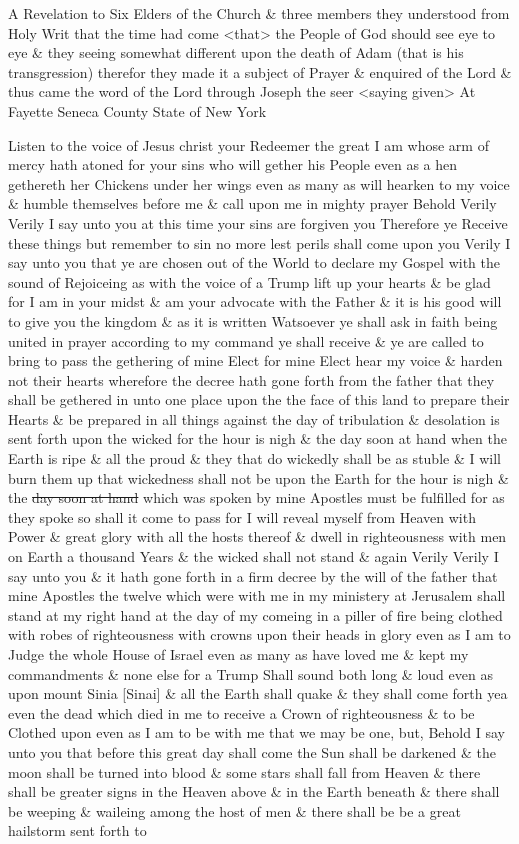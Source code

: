 				A Revelation to Six Elders of the Church \& three members they understood from Holy Writ that the time had come <that> the People of God should see eye to eye \& they seeing somewhat different upon the death of Adam (that is his transgression) therefor they made it a subject of Prayer \& enquired of the Lord \& thus came the word of the Lord through Joseph the seer <saying given> At Fayette Seneca County State of New York
				
				Listen to the voice of Jesus christ your Redeemer the great I am whose arm of mercy hath atoned for your sins who will gether his People even as a hen gethereth her Chickens under her wings even as many as will hearken to my voice \& humble themselves before me \& call upon me in mighty prayer Behold Verily Verily I say unto you at this time your sins are forgiven you Therefore ye Receive these things but remember to sin no more lest perils shall come upon you Verily I say unto you that ye are chosen out of the World to declare my Gospel with the sound of Rejoiceing as with the voice of a Trump lift up your hearts \& be glad for I am in your midst \& am your advocate with the Father \& it is his good will to give you the kingdom \& as it is written Watsoever ye shall ask in faith being united in prayer according to my command ye shall receive \& ye are called to bring to pass the gethering of mine Elect for mine Elect hear my voice \& harden not their hearts wherefore the decree hath gone forth from the father that they shall be gethered in unto one place upon the the face of this land to prepare their Hearts \& be prepared in all things against the day of tribulation \& desolation is sent forth upon the wicked for the hour is nigh \& the day soon at hand when the Earth is ripe \& all the proud \& they that do wickedly shall be as stuble \& I will burn them up that wickedness shall not be upon the Earth for the hour is nigh \& the \sout{day soon at hand} which was spoken by mine Apostles must be fulfilled for as they spoke so shall it come to pass for I will reveal myself from Heaven with Power \& great glory with all the hosts thereof \& dwell in righteousness with men on Earth a thousand Years \& the wicked shall not stand \& again Verily Verily I say unto you \& it hath gone forth in a firm decree by the will of the father that mine Apostles the twelve which were with me in my ministery at Jerusalem shall stand at my right hand at the day of my comeing in a piller of fire being clothed with robes of righteousness with crowns upon their heads in glory even as I am to Judge the whole House of Israel even as many as have loved me \& kept my commandments \& none else for a Trump Shall sound both long \& loud even as upon mount Sinia [Sinai] \& all the Earth shall quake \& they shall come forth yea even the dead which died in me to receive a Crown of righteousness \& to be Clothed upon even as I am to be with me that we may be one, but, Behold I say unto you that before this great day shall come the Sun shall be darkened \& the moon shall be turned into blood \& some stars shall fall from Heaven \& there shall be greater signs in the Heaven above \& in the Earth beneath \& there shall be weeping \& waileing among the host of men \& there shall be be a great hailstorm sent forth to 